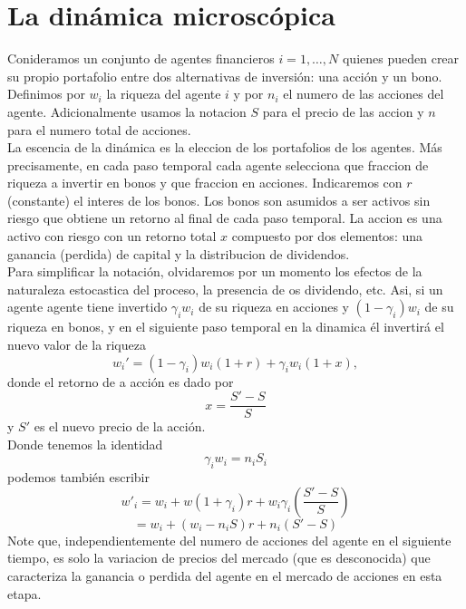 \documentclass[12pt,a4paper]{article}
\begin{document}
\section*{La dinámica microscópica}
\quad Conideramos un conjunto de agentes financieros $i=1,\dots,N$ quienes pueden crear su propio portafolio entre dos alternativas de inversión: una acción y un bono. Definimos por $w_i$ la riqueza del agente $i$ y por $n_i$ el numero de las acciones del agente. Adicionalmente usamos la notacion $S$ para el precio de las accion y $n$ para el numero total de acciones.\\
\quad La escencia de la dinámica es la eleccion de los portafolios de los agentes. Más precisamente, en cada paso temporal cada agente selecciona que fraccion de riqueza a invertir en bonos y que fraccion en acciones. Indicaremos con $r$ (constante) el interes de los bonos. Los bonos son asumidos a ser activos sin riesgo que obtiene un retorno al final de cada paso temporal. La accion es una activo con riesgo con un retorno total $x$ compuesto por dos elementos: una ganancia (perdida) de capital y la distribucion de dividendos.\\
\quad Para simplificar la notación, olvidaremos por un momento los efectos de la naturaleza estocastica del proceso, la presencia de os dividendo, etc. Asi, si un agente agente tiene invertido $\gamma_i w_i$ de su riqueza en acciones y $(1-\gamma_i)w_i$ de su riqueza en bonos, y en el siguiente paso temporal en la dinamica él invertirá el nuevo valor de la riqueza
\begin{equation}
w_{i}'= (1-\gamma_i)w_i(1+r)+\gamma_i w_i (1+x),\label{ec1}
\end{equation}
donde el retorno de a acción es dado por 
\begin{equation}
x =\frac{S'-S}{S}
\end{equation}
y $S'$ es el nuevo precio de la acción.\\
\quad Donde tenemos la identidad
\begin{equation}
\gamma_i w_i=n_iS_i
\end{equation}
podemos también escribir
\begin{equation}
w'_i=w_i+w(1+\gamma_i)r+ w_i\gamma_i\left(\frac{S'-S}{S}\right)
\end{equation}
\begin{equation}
= w_i+(w_i-n_iS)r+n_i(S'-S)
\end{equation}
Note que, independientemente del numero de acciones del agente en el siguiente tiempo, es solo la variacion de precios del mercado (que es desconocida) que caracteriza la ganancia o perdida del agente en el mercado de acciones en esta etapa.\\
\end{document}

